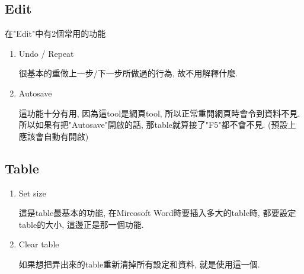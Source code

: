 \newpage
\subsection{Edit}

  在"Edit"中有2個常用的功能


  \begin{enumerate}

    \item
    {
      Undo / Repeat

      很基本的重做上一步/下一步所做過的行為, 故不用解釋什麼.
    } %

    \item
    {
      Autosave

      這功能十分有用, 因為這tool是網頁tool, 所以正常重開網頁時會令到資料不見. 所以如果有把"Autosave"開啟的話, 那table就算接了"F5"都不會不見. (預設上應該會自動有開啟)
    } %

  \end{enumerate}

\newpage
\subsection{Table}

  \begin{enumerate}

    \item
    {
      Set size

      這是table最基本的功能, 在Mircosoft Word時要插入多大的table時, 都要設定table的大小, 這邊正是那一個功能.
    } %

    \item
    {
      Clear table

      如果想把弄出來的table重新清掉所有設定和資料, 就是使用這一個.
    } %

  \end{enumerate}

